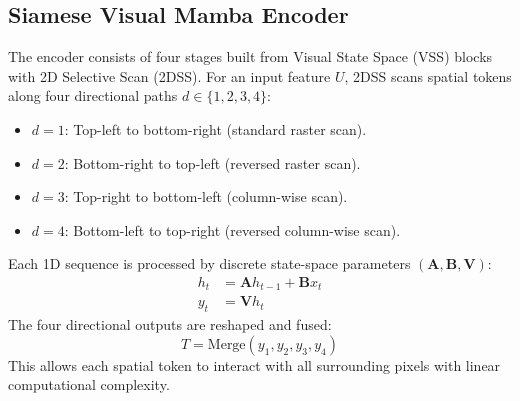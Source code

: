 \documentclass[final,5p,times,twocolumn]{elsarticle}
\begin{document}
\subsection{Siamese Visual Mamba Encoder}
The encoder consists of four stages built from Visual State Space (VSS) blocks with 2D Selective Scan (2DSS). For an input feature $U$, 2DSS scans spatial tokens along four directional paths $d \in \{1, 2, 3, 4\}$:
\begin{itemize}
    \item $d=1$: Top-left to bottom-right (standard raster scan).
    \item $d=2$: Bottom-right to top-left (reversed raster scan).
    \item $d=3$: Top-right to bottom-left (column-wise scan).
    \item $d=4$: Bottom-left to top-right (reversed column-wise scan).
\end{itemize}
Each 1D sequence is processed by discrete state-space parameters $(\mathbf{A}, \mathbf{B}, \mathbf{V})$:
\begin{align}
    h_t &= \mathbf{A} h_{t-1} + \mathbf{B} x_t \\
    y_t &= \mathbf{V} h_t
\end{align}
The four directional outputs are reshaped and fused:
\begin{equation}
    T = \text{Merge}(y_1, y_2, y_3, y_4)
\end{equation}
This allows each spatial token to interact with all surrounding pixels with linear computational complexity.
\end{document}
